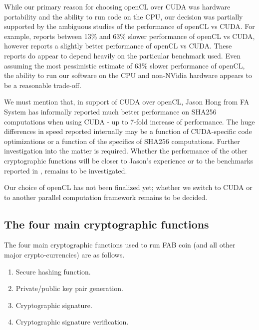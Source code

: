 \documentclass{article}
\begin{document}
While our primary reason for choosing openCL over CUDA was hardware portability and the ability to run code on the CPU, our decision was partially supported by the ambiguous studies of the performance of openCL vs CUDA. For example, \cite{KarimiEtAl:DBLP:CUDAvsOpenCL} reports between 13\% and 63\% slower performance of openCL vs CUDA, however \cite{MemetiLPKK17:CUDAvsOpenCL:DBLP:journals/corr} reports a slightly better performance of openCL vs CUDA. These reports do appear to depend heavily on the particular benchmark used. Even assuming the most pessimistic estimate of 63\% slower performance of openCL, the ability to run our software on the CPU and non-NVidia hardware appears to be a reasonable trade-off. 

We must mention that, in support of CUDA over openCL, Jason Hong from FA System has informally reported much better performance on SHA256 computations when using CUDA - up to 7-fold increase of performance. The huge differences in speed reported internally may be a function of CUDA-specific code optimizations or a function of the specifics of SHA256 computations. Further investigation into the matter is required. Whether the performance of the other cryptographic functions will be closer to Jason's experience or to the benchmarks reported in \cite{KarimiEtAl:DBLP:CUDAvsOpenCL}, \cite{MemetiLPKK17:CUDAvsOpenCL:DBLP:journals/corr} remains to be investigated.

Our choice of openCL has not been finalized yet; whether we switch to CUDA or to another parallel computation framework remains to be decided.


\subsection{The four main cryptographic functions} \label{sectionFourMainCrypto}
The four main cryptographic functions used to run FAB coin (and all other major crypto-currencies) are as follows.
\begin{enumerate}
\item \label{enumFourMainSHA} Secure hashing function.
\item \label{enumFourMainPrivatePublicKeyGeneration} Private/public key pair generation.
\item \label{enumFourMainCryptoSignature} Cryptographic signature.
\item \label{enumFourMainVerification} Cryptographic signature verification.
\end{enumerate}
\end{document}
